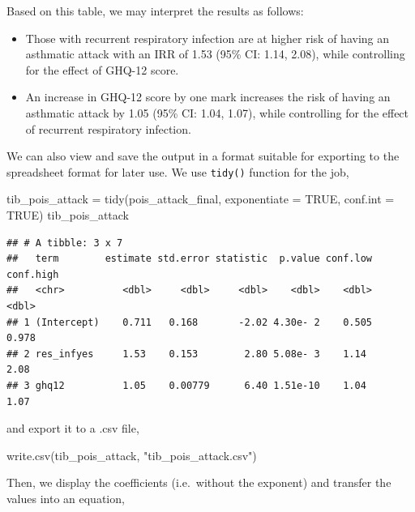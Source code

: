 \documentclass[
  10pt,
]{krantz}
\newenvironment{Shaded}{\begin{snugshade}}{\end{snugshade}}
\newcommand{\AttributeTok}[1]{\textcolor[rgb]{0.77,0.63,0.00}{#1}}
\newcommand{\ConstantTok}[1]{\textcolor[rgb]{0.00,0.00,0.00}{#1}}
\newcommand{\FunctionTok}[1]{\textcolor[rgb]{0.00,0.00,0.00}{#1}}
\newcommand{\NormalTok}[1]{#1}
\newcommand{\OtherTok}[1]{\textcolor[rgb]{0.56,0.35,0.01}{#1}}
\newcommand{\StringTok}[1]{\textcolor[rgb]{0.31,0.60,0.02}{#1}}
\providecommand{\tightlist}{%
  \setlength{\itemsep}{0pt}\setlength{\parskip}{0pt}}
\begin{document}
Based on this table, we may interpret the results as follows:

\begin{itemize}
\tightlist
\item
  Those with recurrent respiratory infection are at higher risk of having an asthmatic attack with an IRR of 1.53 (95\% CI: 1.14, 2.08), while controlling for the effect of GHQ-12 score.
\item
  An increase in GHQ-12 score by one mark increases the risk of having an asthmatic attack by 1.05 (95\% CI: 1.04, 1.07), while controlling for the effect of recurrent respiratory infection.
\end{itemize}

We can also view and save the output in a format suitable for exporting to the spreadsheet format for later use. We use \texttt{tidy()} function for the job,

\begin{Shaded}
\begin{Highlighting}[]
\NormalTok{tib\_pois\_attack }\OtherTok{=} \FunctionTok{tidy}\NormalTok{(pois\_attack\_final, }\AttributeTok{exponentiate =} \ConstantTok{TRUE}\NormalTok{, }
                       \AttributeTok{conf.int =} \ConstantTok{TRUE}\NormalTok{)}
\NormalTok{tib\_pois\_attack}
\end{Highlighting}
\end{Shaded}

\begin{verbatim}
## # A tibble: 3 x 7
##   term        estimate std.error statistic  p.value conf.low conf.high
##   <chr>          <dbl>     <dbl>     <dbl>    <dbl>    <dbl>     <dbl>
## 1 (Intercept)    0.711   0.168       -2.02 4.30e- 2    0.505     0.978
## 2 res_infyes     1.53    0.153        2.80 5.08e- 3    1.14      2.08 
## 3 ghq12          1.05    0.00779      6.40 1.51e-10    1.04      1.07
\end{verbatim}

and export it to a .csv file,

\begin{Shaded}
\begin{Highlighting}[]
\FunctionTok{write.csv}\NormalTok{(tib\_pois\_attack, }\StringTok{"tib\_pois\_attack.csv"}\NormalTok{)}
\end{Highlighting}
\end{Shaded}

Then, we display the coefficients (i.e.~without the exponent) and transfer the values into an equation,
\end{document}
